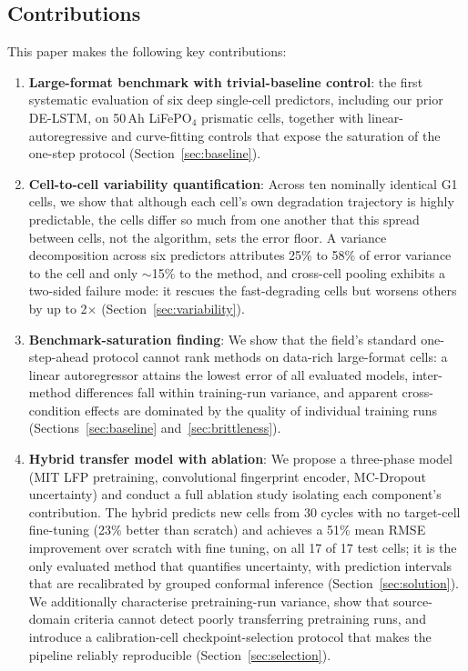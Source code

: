 \subsection{Contributions}
This paper makes the following key contributions:
\begin{enumerate}
  \item \textbf{Large-format benchmark with trivial-baseline control}: the
        first systematic evaluation of six deep single-cell predictors,
        including our prior DE-LSTM, on 50\,Ah LiFePO$_4$ prismatic cells,
        together with linear-autoregressive and curve-fitting controls that
        expose the saturation of the one-step protocol
        (Section~\ref{sec:baseline}).

  \item \textbf{Cell-to-cell variability quantification}: Across ten nominally
        identical G1 cells, we show that although each cell's own degradation
        trajectory is highly predictable, the cells differ so much from one
        another that this spread between cells, not the algorithm, sets the
        error floor.
        A variance decomposition across six predictors attributes 25\% to 58\%
        of error variance to the cell and only ${\sim}$15\% to the method,
        and cross-cell pooling exhibits a two-sided failure mode: it rescues
        the fast-degrading cells but worsens others by up to 2$\times$
        (Section~\ref{sec:variability}).

  \item \textbf{Benchmark-saturation finding}: We show that the field's
        standard one-step-ahead protocol cannot rank methods on data-rich
        large-format cells: a linear autoregressor attains the lowest error of
        all evaluated models, inter-method differences fall within
        training-run variance, and apparent cross-condition effects are
        dominated by the quality of individual training runs
        (Sections~\ref{sec:baseline} and~\ref{sec:brittleness}).

  \item \textbf{Hybrid transfer model with ablation}: We propose a three-phase
        model (MIT LFP pretraining, convolutional fingerprint encoder,
        MC-Dropout uncertainty) and conduct a full ablation study isolating
        each component's contribution.
        The hybrid predicts new cells from 30 cycles with no target-cell
        fine-tuning (23\% better than scratch) and achieves a 51\%
        mean RMSE improvement over scratch with fine tuning, on all 17 of 17
        test cells; it is the only evaluated method that quantifies
        uncertainty, with prediction intervals that are recalibrated by
        grouped conformal inference (Section~\ref{sec:solution}).
        We additionally characterise pretraining-run variance, show that
        source-domain criteria cannot detect poorly transferring pretraining
        runs, and introduce a calibration-cell checkpoint-selection protocol
        that makes the pipeline reliably reproducible
        (Section~\ref{sec:selection}).


\end{enumerate}
